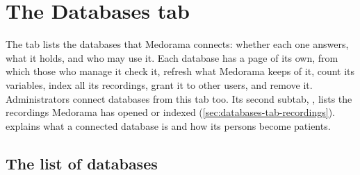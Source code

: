 \chapter{The Databases tab}
\label{chap:databases-tab}

The  tab lists the databases that Medorama connects: whether each one answers,
what it holds, and who may use it. Each database has a page of its own, from which those who
manage it check it, refresh what Medorama keeps of it, count its variables, index all its
recordings, grant it to other users, and remove it. Administrators connect databases from this
tab too. Its second subtab, , lists the recordings Medorama has opened or indexed
(\cref{sec:databases-tab-recordings}).
 explains what a connected database is and how its persons become
patients.


\section{The list of databases}
\label{sec:databases-tab-list}

